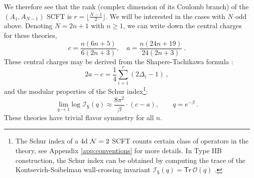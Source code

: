\documentclass[a4paper,10pt]{article}
\newcommand{\mr}[1]{\mathsf{#1}}
\newcommand{\tsf}[1]{\textsf{#1}}
\def\CN {{\cal N}}
\begin{document}
We therefore see that the rank (complex dimension of its Coulomb branch) of the $(A_1,A_{N-1})$ \tsf{SCFT} is $r=\lfloor\frac{N-1}{2}\rfloor$. We will be interested in the cases with $N$ odd above. Denoting $N=2n+1$ with $n\geq 1$, we can write down the central charges for these theories,
\begin{equation}
    c=\frac{n(6n+5)}{6(2n+3)}, \quad a=\frac{n(24n+19)}{24(2n+3)}~.
\end{equation}
These central charges may be derived from the Shapere-Tachikawa formula \cite{Shapere:2008zf}: 
\begin{equation}
    2a-c=\frac{1}{4}\sum_{i=1}^{r}(2\Delta_i-1)~,
\end{equation}
and the modular properties of the Schur index\footnote{The Schur index of a 4d 
$\CN=2$ \tsf{SCFT} counts certain class of operators in the theory, see Appendix \ref{app:conventions} for more details. In Type \tsf{IIB} construction, the Schur index can be obtained by computing the trace of the Kontsevich-Soibelman wall-crossing invariant $\mathcal{I}_{\mr{S}}(q)=\mr{Tr}~\mathcal{O}(q)$ \cite{Cordova:2015nma,Cecotti:2010fi}.}: 
\begin{equation}
    \lim_{q\to 1}\text{log }\mathcal{I}_{\mr{S}}(q)\approx \frac{8\pi^2}{\beta}\cdot (c-a), \quad  \quad q=e^{-\beta}~.
\end{equation}
These theories have trivial flavor symmetry for all $n$. 
\end{document}
